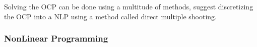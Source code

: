 Solving the \gls{OCP} can be done using a multitude of methods, \cite{breivik2017mpc} suggest discretizing 
the \gls{OCP} into a \gls{NLP} using a method called direct multiple shooting.


\subsubsection*{NonLinear Programming}
